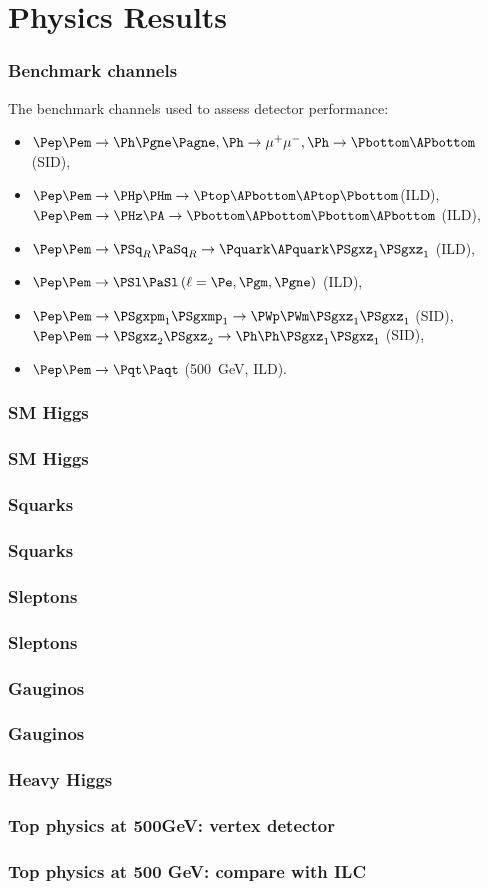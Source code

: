 \documentclass{beamer}
\begin{document}
\section{Physics Results}
\begin{frame}
 \frametitle{Benchmark channels}
The benchmark channels used to assess detector performance:
\begin{itemize}
\item $\Pep\Pem \to \Ph \Pgne \Pagne, \Ph \to \mu^+\mu^-, \Ph \to
\Pbottom\APbottom$ (SID),
\item  $\Pep\Pem \to \PHp \PHm\to \Ptop\APbottom\APtop\Pbottom$(ILD),\\
$\Pep\Pem \to \PHz \PA\to\Pbottom\APbottom\Pbottom\APbottom$ (ILD),
\item $\Pep\Pem \to \PSq_R \PaSq_R\to\Pquark\APquark\PSgxz_1\PSgxz_1$ (ILD), 
\item $\Pep\Pem \to \PSl \PaSl \,(\ell = \Pe,\Pgm,\Pgne)$ (ILD), 
\item $\Pep\Pem \to \PSgxpm_1 \PSgxmp_1\to\PWp\PWm\PSgxz_1\PSgxz_1$ (SID),\\
$\Pep\Pem \to \PSgxz_2 \PSgxz_2\to \Ph\Ph\PSgxz_1\PSgxz_1$ (SID),
\item  $\Pep\Pem \to \Pqt \Paqt$ (500~GeV, ILD).
\end{itemize} 
\end{frame}
\begin{frame}
\frametitle{SM Higgs}
\end{frame}
\begin{frame}
\frametitle{SM Higgs}
\end{frame}
\begin{frame}
\frametitle{Squarks}
\end{frame}
\begin{frame}
\frametitle{Squarks}
\end{frame}
\begin{frame}
\frametitle{Sleptons}
\end{frame}
\begin{frame}
\frametitle{Sleptons}
\end{frame}
\begin{frame}
\frametitle{Gauginos}
\end{frame}
\begin{frame}
\frametitle{Gauginos}
\end{frame}
\begin{frame}
\frametitle{Heavy Higgs}
\end{frame}
\begin{frame}
\frametitle{Top physics at 500GeV: vertex detector}
\end{frame}
\begin{frame}
\frametitle{Top physics at 500 GeV: compare with ILC}
\end{frame}
\end{document}
